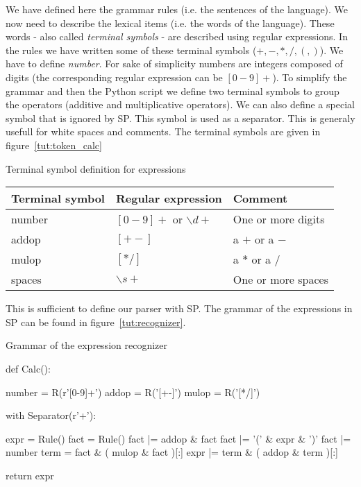 We have defined here the grammar rules (i.e. the sentences of the language). We now need to describe the lexical items (i.e. the words of the language). These words - also called \emph{terminal symbols} - are described using regular expressions. In the rules we have written some of these terminal symbols ($+, -, *, /, (, )$). We have to define \emph{number}. For sake of simplicity numbers are integers composed of digits (the corresponding regular expression can be $[0-9]+$).
To simplify the grammar and then the Python script we define two terminal symbols to group the operators (additive and multiplicative operators). We can also define a special symbol that is ignored by SP. This symbol is used as a separator. This is generaly usefull for white spaces and comments. The terminal symbols are given in figure~\ref{tut:token_calc}

\begin{tableau}
\caption{Terminal symbol definition for expressions}        \label{tut:token_calc}
\begin{tabular}{| l | l | l |}
\hline
    Terminal symbol & Regular expression & Comment \\
\hline
\hline
    number & $[0-9]+$ or $\backslash d+$ & One or more digits \\
\hline
    addop & $[+-]$ & a $+$ or a $-$ \\
\hline
    mulop & $[*/]$ & a $*$ or a $/$ \\
\hline
    spaces & $\backslash s+$ & One or more spaces \\
\hline
\end{tabular}
\end{tableau}

This is sufficient to define our parser with SP. The grammar of the expressions in SP can be found in figure~\ref{tut:recognizer}.

\begin{code}
\caption{Grammar of the expression recognizer}              \label{tut:recognizer}
\begin{verbatimtab}[4]
def Calc():

    number = R(r'[0-9]+')
    addop = R('[+-]')
    mulop = R('[*/]')

    with Separator(r'\s+'):

        expr = Rule()
        fact = Rule()
        fact |= addop & fact
        fact |= '(' & expr & ')'
        fact |= number
        term = fact & ( mulop & fact )[:]
        expr |= term & ( addop & term )[:]

    return expr

\end{verbatimtab}
\end{code}

